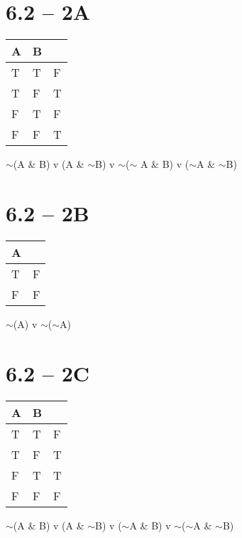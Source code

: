 \documentclass{hitec}
\begin{document}
\section*{6.2 -- 2A}
\begin{tabular}{ll|l}
    A&B&\\\hline
    T&T&F\\
    T&F&T\\
    F&T&F\\
    F&F&T\\
\end{tabular}

$\sim$(A \& B) v (A \& $\sim$B) v $\sim$($\sim$ A \& B) v ($\sim$A \& $\sim$B)

\section*{6.2 -- 2B}
\begin{tabular}{l|l}
    A&\\\hline
    T&F\\
    F&F\\
\end{tabular}

$\sim$(A) v $\sim$($\sim$A)
\section*{6.2 -- 2C}
\begin{tabular}{ll|l}
    A&B&\\\hline
    T&T&F\\
    T&F&T\\
    F&T&T\\
    F&F&F\\
\end{tabular}

$\sim$(A \& B) v (A \& $\sim$B) v ($\sim$A \& B) v $\sim$($\sim$A \& $\sim$B)
\end{document}
